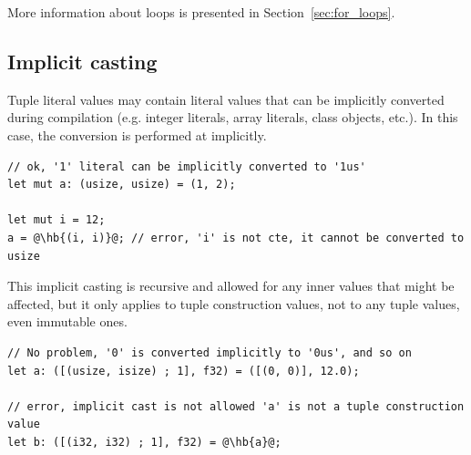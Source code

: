 More information about  loops is presented in Section~\ref{sec:for_loops}.

\subsection {Implicit casting}

Tuple literal values may contain literal values that can be implicitly
converted during compilation (e.g. integer literals, array literals, class
objects, etc.). In this case, the conversion is performed at 
implicitly.

\begin{lstlisting}[style=coloredverbatimError, escapechar=@]
// ok, '1' literal can be implicitly converted to '1us'
let mut a: (usize, usize) = (1, 2);

let mut i = 12;
a = @\hb{(i, i)}@; // error, 'i' is not cte, it cannot be converted to usize
\end{lstlisting}

This implicit casting is recursive and allowed for any inner values that might
be affected, but it only applies to tuple construction values, not to any tuple
values, even immutable ones.

\begin{lstlisting}[style=coloredverbatimError, escapechar=@]
// No problem, '0' is converted implicitly to '0us', and so on
let a: ([(usize, isize) ; 1], f32) = ([(0, 0)], 12.0);

// error, implicit cast is not allowed 'a' is not a tuple construction value
let b: ([(i32, i32) ; 1], f32) = @\hb{a}@;
\end{lstlisting}

\vfill%
\pagebreak
